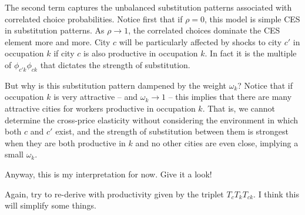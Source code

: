 \documentclass[12pt]{article}
\begin{document}
The second term captures the unbalanced substitution patterns associated with correlated choice probabilities. Notice first that if $\rho=0$, this model is simple CES in substitution patterns. As $\rho\rightarrow{1}$, the correlated choices dominate the CES element more and more. City $c$ will be particularly affected by shocks to city $c'$ in occupation $k$ if city $c$ is also productive in occupation $k$. In fact it is the multiple of $\phi_{{c'}k}\phi_{ck}$ that dictates the strength of substitution.

But why is this substitution pattern dampened by the weight $\omega_{k}$? Notice that if occupation $k$ is very attractive -- and $\omega_{k}\rightarrow{1}$ -- this implies that there are many attractive cities for workers productive in occupation $k$. That is, we cannot determine the cross-price elasticity without considering the environment in which both $c$ and $c'$ exist, and the strength of substitution between them is strongest when they are both productive in $k$ and no other cities are even close, implying a small $\omega_{k}$.

Anyway, this is my interpretation for now. Give it a look!

Again, try to re-derive with productivity given by the triplet $T_{c}T_{k}T_{ck}$. I think this will simplify some things.
\end{document}
